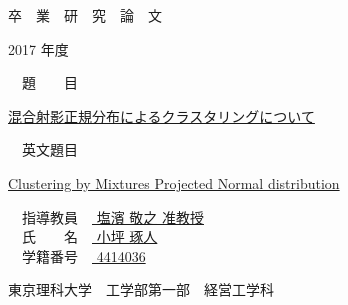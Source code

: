 \documentclass[a4j,11pt]{jarticle}
\begin{document}
\begin{center}
{\Huge 卒　業　研　究　論　文}
\end{center}
\vspace{2cm}
\begin{center}
{\huge 2017 年度}
\end{center}
\vspace{3cm}
\begin{flushleft}
{\huge　題　　目　}
\end{flushleft}
\begin{center}
{\huge \underline{混合射影正規分布によるクラスタリングについて}}\\
\end{center}
\begin{flushleft}
{\huge　英文題目　}
\end{flushleft}
\begin{center}
{\huge \underline{ Clustering by Mixtures Projected Normal distribution }}\\
\end{center}
\vspace{5.5cm}
\begin{flushleft}
{\huge　指導教員　\underline{ 塩濱 敬之 准教授 }}\\
\vspace{5mm}
{\huge　氏　　名　\underline{ 小坪 琢人 }}\\
\vspace{5mm}
{\huge　学籍番号　\underline{ 4414036 }}
\end{flushleft}
\vspace{2cm}
\begin{flushright}
{\LARGE 東京理科大学　工学部第一部　経営工学科}\\
\end{flushright}
\end{document}
